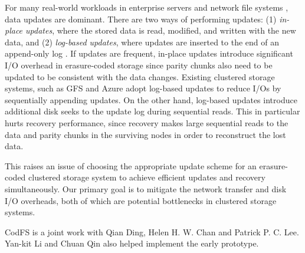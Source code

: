 For many real-world workloads in enterprise servers and network file systems
\cite{adams12,narayanan08}, data updates are dominant.  There are two ways of
performing updates: (1) {\em in-place updates}, where the stored data is read,
modified, and written with the new data, and (2) {\em log-based updates},
where updates are inserted to the end of an append-only log
\cite{rosenblum92}.  If updates are frequent, in-place updates introduce
significant I/O overhead in erasure-coded storage since parity chunks also
need to be updated to be consistent with the data changes.  Existing
clustered storage systems, such as GFS \cite{ghemawat03} and Azure 
\cite{calder11} adopt log-based updates to reduce I/Os by sequentially
appending updates.  On the other hand, log-based updates introduce additional
disk seeks to the update log during sequential reads.  This in particular
hurts recovery performance, since recovery makes large sequential reads to the
data and parity chunks in the surviving nodes in order to reconstruct the lost
data. 

This raises an issue of choosing the appropriate update scheme for an
erasure-coded clustered storage system to achieve efficient updates and
recovery simultaneously.  Our primary goal is to mitigate the network transfer
and disk I/O overheads, both of which are potential bottlenecks in clustered
storage systems. 



CodFS is a joint work with Qian Ding, Helen H. W. Chan and Patrick P. C. Lee.
Yan-kit Li and Chuan Qin also helped implement the early prototype.


